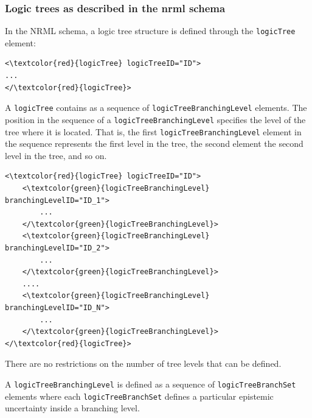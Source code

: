 \subsubsection{Logic trees as described in the nrml schema}
In the NRML schema, a logic tree structure is defined through the 
\Verb+logicTree+ element: 
%
\begin{Verbatim}[frame=single, commandchars=\\\{\}]
<\textcolor{red}{logicTree} logicTreeID="ID">
...
</\textcolor{red}{logicTree}>
\end{Verbatim}
%
A \Verb+logicTree+ contains as a sequence of \Verb+logicTreeBranchingLevel+ 
elements. 
The position in the sequence of a \Verb+logicTreeBranchingLevel+ specifies 
the level of the tree where it is located. That is, the first 
\texttt{logicTreeBranchingLevel} element in the sequence represents 
the first level in the tree, the second element the second level in
the tree, and so on.
%
\begin{Verbatim}[frame=single, commandchars=\\\{\}]
<\textcolor{red}{logicTree} logicTreeID="ID">
	<\textcolor{green}{logicTreeBranchingLevel} branchingLevelID="ID_1">
		...
	</\textcolor{green}{logicTreeBranchingLevel}>
	<\textcolor{green}{logicTreeBranchingLevel} branchingLevelID="ID_2">
		...
	</\textcolor{green}{logicTreeBranchingLevel}>
	....
	<\textcolor{green}{logicTreeBranchingLevel} branchingLevelID="ID_N">
		...
	</\textcolor{green}{logicTreeBranchingLevel}>
</\textcolor{red}{logicTree}>
\end{Verbatim}
There are no restrictions on the number of tree levels that can 
be defined.

A \Verb+logicTreeBranchingLevel+ is defined as a sequence of 
\Verb+logicTreeBranchSet+ elements where each \Verb+logicTreeBranchSet+ 
defines a particular epistemic uncertainty inside a branching level. 

